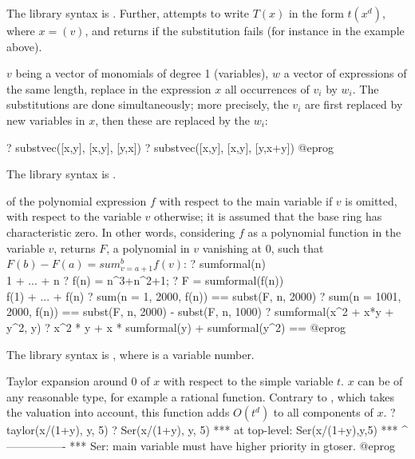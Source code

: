 The library syntax is .
Further,  attempts to
write $T(x)$ in the form $t(x^d)$, where $x=$$(v)$, and returns
 if the substitution fails (for instance in the example 
above).

\label{se:substvec}
$v$ being a vector of monomials of degree 1 (variables),
$w$ a vector of expressions of the same length, replace in the expression
$x$ all occurrences of $v_i$ by $w_i$. The substitutions are done
simultaneously; more precisely, the $v_i$ are first replaced by new
variables in $x$, then these are replaced by the $w_i$:

\bprog
? substvec([x,y], [x,y], [y,x])
? substvec([x,y], [x,y], [y,x+y])
@eprog

The library syntax is .

\label{se:sumformal}
 of the polynomial expression $f$ with respect to the
main variable if $v$ is omitted, with respect to the variable $v$ otherwise;
it is assumed that the base ring has characteristic zero. In other words,
considering $f$ as a polynomial function in the variable $v$,
returns $F$, a polynomial in $v$ vanishing at $0$, such that $F(b) - F(a)
= sum_{v = a+1}^b f(v)$:
\bprog
? sumformal(n)  \\ 1 + ... + n
? f(n) = n^3+n^2+1;
? F = sumformal(f(n))  \\ f(1) + ... + f(n)
? sum(n = 1, 2000, f(n)) == subst(F, n, 2000)
? sum(n = 1001, 2000, f(n)) == subst(F, n, 2000) - subst(F, n, 1000)
? sumformal(x^2 + x*y + y^2, y)
? x^2 * y + x * sumformal(y) + sumformal(y^2) == %
@eprog

The library syntax is , where  is a variable number.

\label{se:taylor}
Taylor expansion around $0$ of $x$ with respect to
the simple variable $t$. $x$ can be of any reasonable type, for example a
rational function. Contrary to , which takes the valuation into
account, this function adds $O(t^d)$ to all components of $x$.
\bprog
? taylor(x/(1+y), y, 5)
? Ser(x/(1+y), y, 5)
 ***   at top-level: Ser(x/(1+y),y,5)
 ***                 ^----------------
 *** Ser: main variable must have higher priority in gtoser.
@eprog

